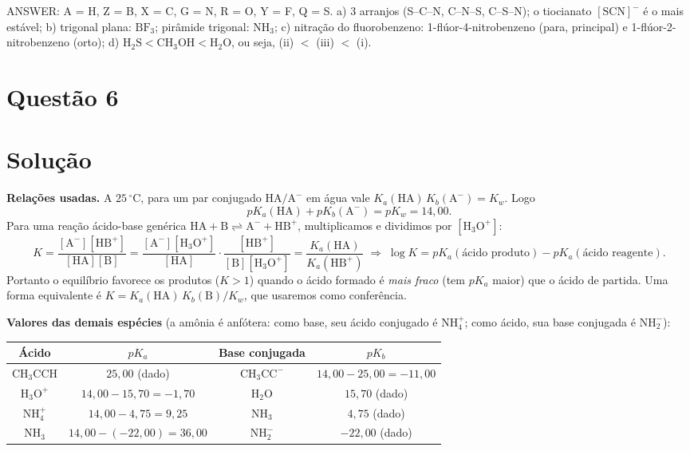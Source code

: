 \documentclass{article}%
\begin{document}
\medskip
ANSWER: A = H, Z = B, X = C, G = N, R = O, Y = F, Q = S. a) 3 arranjos (S--C--N, C--N--S, C--S--N); o tiocianato $[\text{SCN}]^-$ é o mais estável; b) trigonal plana: $\text{BF}_3$; pirâmide trigonal: $\text{NH}_3$; c) nitração do fluorobenzeno: 1-flúor-4-nitrobenzeno (para, principal) e 1-flúor-2-nitrobenzeno (orto); d) $\text{H}_2\text{S}<\text{CH}_3\text{OH}<\text{H}_2\text{O}$, ou seja, (ii) $<$ (iii) $<$ (i).%
\newpage%
\section*{Questão 6}

\section*{Solução}

\textbf{Relações usadas.} A $25\,^{\circ}\mathrm{C}$, para um par conjugado $\mathrm{HA}/\mathrm{A^-}$ em água vale $K_a(\mathrm{HA})\,K_b(\mathrm{A^-})=K_w$. Logo
\[
pK_a(\mathrm{HA})+pK_b(\mathrm{A^-})=pK_w=14{,}00 .
\]
Para uma reação ácido-base genérica $\mathrm{HA}+\mathrm{B}\rightleftharpoons \mathrm{A^-}+\mathrm{HB^+}$, multiplicamos e dividimos por $[\mathrm{H_3O^+}]$:
\[
K=\frac{[\mathrm{A^-}][\mathrm{HB^+}]}{[\mathrm{HA}][\mathrm{B}]}
=\frac{[\mathrm{A^-}][\mathrm{H_3O^+}]}{[\mathrm{HA}]}\cdot\frac{[\mathrm{HB^+}]}{[\mathrm{B}][\mathrm{H_3O^+}]}
=\frac{K_a(\mathrm{HA})}{K_a(\mathrm{HB^+})}
\;\Longrightarrow\;
\log K = pK_a(\text{ácido produto})-pK_a(\text{ácido reagente}).
\]
Portanto o equilíbrio favorece os produtos ($K>1$) quando o ácido formado é \emph{mais fraco} (tem $pK_a$ maior) que o ácido de partida. Uma forma equivalente é $K=K_a(\mathrm{HA})\,K_b(\mathrm{B})/K_w$, que usaremos como conferência.

\textbf{Valores das demais espécies} (a amônia é anfótera: como base, seu ácido conjugado é $\mathrm{NH_4^+}$; como ácido, sua base conjugada é $\mathrm{NH_2^-}$):

\begin{center}
\begin{tabular}{c|c||c|c}
Ácido & $pK_a$ & Base conjugada & $pK_b$\\ \hline
$\mathrm{CH_3CCH}$ & $25{,}00$ (dado) & $\mathrm{CH_3CC^-}$ & $14{,}00-25{,}00=-11{,}00$\\
$\mathrm{H_3O^+}$ & $14{,}00-15{,}70=-1{,}70$ & $\mathrm{H_2O}$ & $15{,}70$ (dado)\\
$\mathrm{NH_4^+}$ & $14{,}00-4{,}75=9{,}25$ & $\mathrm{NH_3}$ & $4{,}75$ (dado)\\
$\mathrm{NH_3}$ & $14{,}00-(-22{,}00)=36{,}00$ & $\mathrm{NH_2^-}$ & $-22{,}00$ (dado)
\end{tabular}
\end{center}
\end{document}
